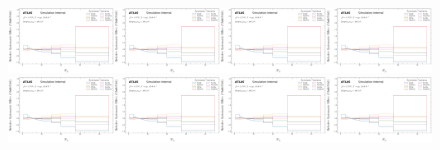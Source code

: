 \begin{figure}[h!]
\includegraphics[width=0.25\textwidth,page=9]{figures/SimResults/MultiFold_Theory_SystEffect.pdf}\includegraphics[width=0.25\textwidth,page=10]{figures/SimResults/MultiFold_Theory_SystEffect.pdf}\includegraphics[width=0.25\textwidth,page=11]{figures/SimResults/MultiFold_Theory_SystEffect.pdf}\includegraphics[width=0.25\textwidth,page=12]{figures/SimResults/MultiFold_Theory_SystEffect.pdf}\\
\includegraphics[width=0.25\textwidth,page=13]{figures/SimResults/MultiFold_Theory_SystEffect.pdf}\includegraphics[width=0.25\textwidth,page=14]{figures/SimResults/MultiFold_Theory_SystEffect.pdf}\includegraphics[width=0.25\textwidth,page=15]{figures/SimResults/MultiFold_Theory_SystEffect.pdf}\includegraphics[width=0.25\textwidth,page=16]{figures/SimResults/MultiFold_Theory_SystEffect.pdf}\\

\end{figure}
